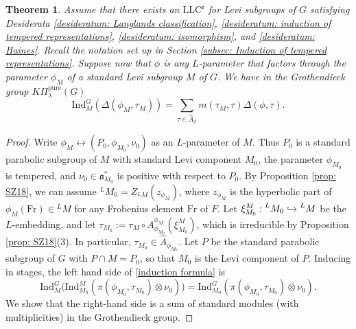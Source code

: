 \documentclass[11pt,letterpaper]{amsart}
\newcommand{\irrepdual}[1]{\widehat{#1}}
\newcommand{\pure}{\mathrm{pure}}
\newcommand{\mfr}[1]{\mathfrak{#1}}
\newcommand{\Fr}{\mathrm{Fr}}
\newcommand{\Ind}{\mathrm{Ind}}
\newcommand{\LLC}{\mathrm{LLC}}
\newtheorem{thm}{Theorem}[section]
\renewcommand{\1}{\mathbbm{1}}
\numberwithin{equation}{section}
\begin{document}
{\begin{thm}\label{theorem: induction formula}
Assume that there exists an $\LLC^{\mathfrak{e}}$ for Levi subgroups of $G$ satisfying Desiderata \ref{desideratum: Langlands classification}, \ref{desideratum: induction of tempered representations}, \ref{desideratum: isomorphism}, and \ref{desideratum: Haines}. Recall the notation set up in Section \ref{subsec: Induction of tempered representations}. Suppose now that $\phi$ is \emph{any} $L$-parameter that factors through the parameter $\phi_M$ of a standard Levi subgroup $M$ of $G$. We have in the Grothendieck group $K\Pi_\lambda^\pure(G)$
\begin{equation}\label{induction formula}
   \Ind_{M}^{G} (\Delta(\phi_M,\tau_M))=\sum_{\tau \in \widehat{A}_{\phi}} m(\tau_M, \tau) \Delta(\phi, \tau).
\end{equation}
\end{thm}
\begin{proof}
    Write $\phi_M \leftrightarrow (P_0, \phi_{M_0}, \nu_0)$ as an $L$-parameter of $M$. Thus $P_0$ is a standard parabolic subgroup of $M$ with standard Levi component $M_0$, the parameter $\phi_{M_0}$ is tempered, and $\nu_0 \in \mfr{a}^*_{M_0}$ is positive with respect to $P_0$.  By Proposition \ref{prop: SZ18}, we can assume
    ${}^LM_0 = Z_{{}^L M}(z_{\phi_M})$, where $z_{\phi_M}$ is the hyperbolic part of $\phi_M(\Fr) \in {}^L{M}$ for any Frobenius element $\Fr$ of $F$. Let $\xi_{M_0}^M: \prescript{L}{}{M_0} \hookrightarrow \prescript{L}{}{M}$ be the $L$-embedding, and let $\tau_{M_0}:= \tau_M \circ A_{\phi_{M_0}}^{\phi_M}(\xi_{M_0}^M)$, which is irreducible by Proposition \ref{prop: SZ18}(3). In particular, $\tau_{M_0} \in \irrepdual{A}_{\phi_{M_0}}$. Let $P$ be the standard parabolic subgroup of $G$ with $P\cap M=P_0$, so that $M_0$ is the Levi component of $P$. Inducing in stages, the left hand side of \eqref{induction formula} is
    \[ \Ind_{M}^G \big(\Ind_{M_0}^M (\pi(\phi_{M_0},\tau_{M_0}) \otimes \nu_0)\big) = \Ind_{M_0}^G (\pi(\phi_{M_0},\tau_{M_0}) \otimes \nu_0).\]
    We show that the right-hand side is a sum of standard modules (with multiplicities) in the Grothendieck group.


\end{proof}}
\end{document}

